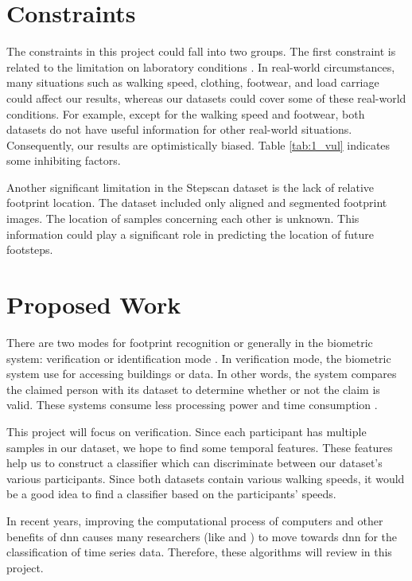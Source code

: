 \section{Constraints}
The constraints in this project could fall into two groups. The first constraint is related to the limitation on laboratory conditions \cite{Connor2018BiometricFeatures}. In real-world circumstances, many situations such as walking speed, clothing, footwear, and load carriage could affect our results, whereas our datasets could cover some of these real-world conditions. For example, except for the walking speed and footwear, both datasets do not have useful information for other real-world situations. Consequently, our results are optimistically biased. Table \ref{tab:1_vul} indicates some inhibiting factors. 

Another significant limitation in the Stepscan dataset is the lack of relative footprint location. The dataset included only aligned and segmented footprint images. The location of samples concerning each other is unknown. This information could play a significant role in predicting the location of future footsteps. 

 

\section{Proposed Work}

There are two modes for footprint recognition or generally in the biometric system: verification or identification mode \cite{Jain2004AnRecognition}. In verification mode, the biometric system use for accessing buildings or data. In other words, the system compares the claimed person with its dataset to determine whether or not the claim is valid. These systems consume less processing power and time consumption \cite{Jain2004AnRecognition}. 



This project will focus on verification. Since each participant has multiple samples in our dataset, we hope to find some temporal features. These features help us to construct a classifier which can discriminate between our dataset’s various participants. Since both datasets contain various walking speeds, it would be a good idea to find a classifier based on the participants' speeds.

In recent years, improving the computational process of computers and other benefits of \gls{dnn} causes many researchers (like \cite{IsmailFawaz2019DeepReview} and \cite{Costilla-Reyes2018DeepSensors}) to move towards \gls{dnn} for the classification of time series data. Therefore, these algorithms will review in this project. 



